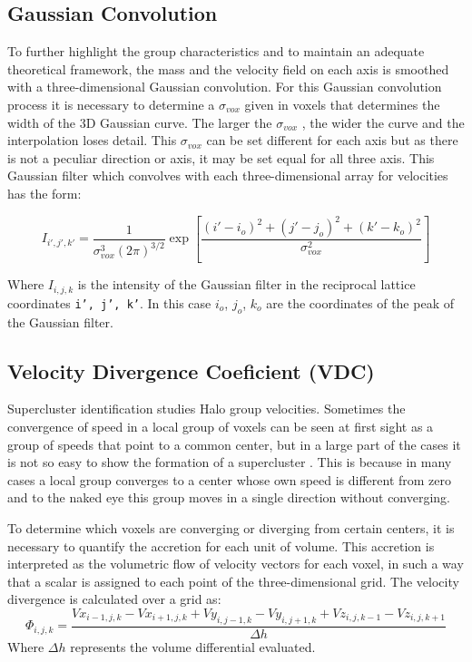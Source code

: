 \subsection{Gaussian Convolution}
\label{sec:INTROGCOnv}


To further highlight the group characteristics and to maintain an adequate theoretical framework, the mass and the velocity field on each axis is smoothed with a three-dimensional Gaussian convolution. For this Gaussian convolution process it is necessary to determine a $\sigma_{vox}$ given in voxels that determines the width of the 3D Gaussian curve. The larger the $\sigma_{vox}$ , the wider the curve and the interpolation loses detail. This $\sigma_{vox}$ can be set different for each axis but as there is not a peculiar direction or axis, it may be set equal for all three axis. This Gaussian filter which convolves with each three-dimensional array for velocities has the form:

\begin{equation}
    I_{i',j',k'}=\frac{1}{\sigma_{vox}^3 (2\pi)^{3/2}} \exp{ \left[ \frac{(i'-i_o)^2+(j'-j_o)^2+(k'-k_o)^2}{\sigma_{vox}^2}\right]}
\end{equation}

Where $I_{i,j,k}$ is the intensity of the Gaussian filter in the reciprocal lattice coordinates \texttt{i', j', k'}. In this case $i_o$, $j_o$, $k_o$ are the coordinates of the peak of the Gaussian filter.
 





\subsection{Velocity Divergence Coeficient (VDC)}
\label{sec:INTROVDC}
Supercluster identification studies Halo group velocities. Sometimes the convergence of speed in a local group of voxels can be seen at first sight as a group of speeds that point to a common center, but in a large part of the cases it is not so easy to show the formation of a supercluster . This is because in many cases a local group converges to a center whose own speed is different from zero and to the naked eye this group moves in a single direction without converging.

To determine which voxels are converging or diverging from certain centers, it is necessary to quantify the accretion for each unit of volume. This accretion is interpreted as the volumetric flow of velocity vectors for each voxel, in such a way that a scalar is assigned to each point of the three-dimensional grid.
The velocity divergence is calculated over a grid as:
\begin{equation}
\Phi_{i,j,k}=\frac{Vx_{i-1,j,k}-Vx_{i+1,j,k}+Vy_{i,j-1,k}-Vy_{i,j+1,k}+Vz_{i,j,k-1}-Vz_{i,j,k+1}}{\Delta h}
\label{eq:VDCcalculo}
\end{equation}
Where $\Delta h$ represents the volume differential evaluated.


